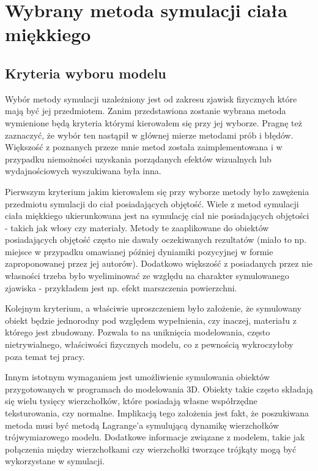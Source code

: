 \chapter{Wybrany metoda symulacji ciała miękkiego}

\section{Kryteria wyboru modelu}

Wybór metody symulacji uzależniony jest od zakresu zjawisk fizycznych które mają
być jej przedmiotem. Zanim przedstawiona zostanie wybrana metoda wymienione będą
kryteria którymi kierowałem się przy jej wyborze.  Pragnę też zaznaczyć, że
wybór ten nastąpił w głównej mierze metodami prób i błędów.  Większość z
poznanych przeze mnie metod została zaimplementowana i w przypadku niemożności
uzyskania porządanych efektów wizualnych lub wydajnościowych wyszukiwana była
inna.

Pierwszym kryterium jakim kierowałem się przy wyborze metody było zawężenia
przedmiotu symulacji do ciał posiadających objętość. Wiele z metod symulacji
ciała miękkiego ukierunkowana jest na symulację ciał nie posiadających objętości
- takich jak włosy czy materiały. Metody te zaaplikowane do obiektów
posiadających objętość często nie dawały oczekiwanych rezultatów (miało to
		np. miejsce w przypadku omawianej później dyniamiki pozycyjnej w formie
		zaproponowanej przez jej autorów). Dodatkowo większość z posiadanych przez nie
własności trzeba było wyeliminować ze względu na charakter symulowanego zjawiska
- przykładem jest np. efekt marszczenia powierzchni.

Kolejnym kryterium, a właściwie uproszczeniem było założenie, że symulowany
obiekt będzie jednorodny pod względem wypełnienia, czy inaczej, materiału z
którego jest zbudowany. Pozwala to na uniknięcia modelowania, często
nietrywialnego, właściwości fizycznych modelu, co z pewnością wykroczyłoby poza
temat tej pracy. 

Innym istotnym wymaganiem jest umożliwienie symulowania obiektów
przygotowanych w programach do modelowania 3D. Obiekty takie często składają się
wielu tysięcy wierzchołków, które posiadają własne współrzędne teksturowania,
czy normalne. Implikacją tego założenia jest fakt, że poszukiwana metoda musi być
metodą Lagrange'a symulującą dynamikę wierzchołków trójwymiarowego modelu.
Dodatkowe informacje związane z modelem, takie jak połączenia między
wierzchołkami czy wierzchołki tworzące trójkąty mogą być wykorzystane w
symulacji.

